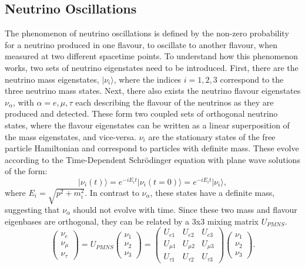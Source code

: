 \documentclass[11pt]{article}
\newcommand{\ket}[1]{\lvert #1 \rangle}
\begin{document}
 \subsection{Neutrino Oscillations}
 \setcounter{equation}{0}
\noindent The phenomenon of neutrino oscillations is defined by the non-zero probability for a neutrino produced in one flavour, to oscillate to another flavour, when measured at two different spacetime points. To understand how this phenomenon works, two sets of neutrino eigenstates need to be introduced. First, there are the neutrino mass eigenstates, $\ket{\nu_i}$, where the indices $i=1,2,3$ correspond to the three neutrino mass states. Next, there also exists the neutrino flavour eigenstates $\nu_{\alpha}$, with $\alpha = e, \mu, \tau$ each describing the flavour of the neutrinos as they are produced and detected. These form two coupled sets of orthogonal neutrino states, where the flavour eigenstates can be written as a linear superposition of the mass eigenstates, and vice-versa. $\nu_i$ are the stationary states of the free particle Hamiltonian and correspond to particles with definite mass. These evolve according to the Time-Dependent Schrödinger equation with plane wave solutions of the form:
\begin{equation} 
    \ket{\nu_i(t)} = e^{-iE_it}\ket{\nu_i(t=0)} = e^{-iE_it}\ket{\nu_i},
\end{equation}
where $E_i = \sqrt{p^2 + m_i^2}$. In contrast to $\nu_{\alpha}$, these states have a definite mass, suggesting that $\nu_{\alpha}$ should not evolve with time. Since these two mass and flavour eigenbases are orthogonal, they can be related by a 3x3 mixing matrix $U_{PMNS}$.
\begin{equation}
    \begin{pmatrix} \nu_e \\ \nu_{\mu} \\ \nu_{\tau} \end{pmatrix} = U_{PMNS} \begin{pmatrix}
        \nu_1 \\ \nu_2 \\ \nu_3 
    \end{pmatrix} =
    \begin{pmatrix}
        U_{e1} & U_{e2} & U_{e3} \\ U_{\mu 1} & U_{\mu 2} & U_{\mu 3} \\ U_{\tau 1} & U_{\tau 2} & U_{\tau 3}
    \end{pmatrix}
    \begin{pmatrix}
        \nu_1 \\ \nu_2 \\ \nu_3 
    \end{pmatrix}.
\end{equation}
\end{document}
